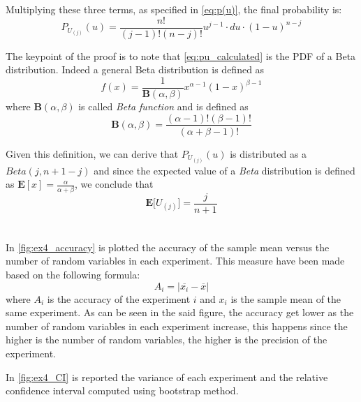 \documentclass[11pt,a4paper]{article}
\begin{document}
Multiplying these three terms, as specified in \autoref{eq:p(u)}, the final probability is:
\begin{equation}
  \label{eq:pu_calculated}
  P_{U_{(j)}}(u) = \frac{n!}{(j-1)!(n-j)!}u^{j-1}\cdot du \cdot (1-u)^{n-j}
\end{equation}

The keypoint of the proof is to note that \autoref{eq:pu_calculated} is the PDF of a Beta distribution.
Indeed a general Beta distribution is defined as
\begin{equation}
  \label{eq:beta}
  f(x) = \frac{1}{\mathbf{B}(\alpha,\beta)}x^{\alpha-1}(1-x)^{\beta-1}
\end{equation}
where $\mathbf{B}(\alpha,\beta)$ is called \textit{Beta function} and is defined as
\begin{equation}
  \label{eq:beta_func}
  \mathbf{B}(\alpha,\beta) = \frac{(\alpha-1)!(\beta-1)!}{(\alpha+\beta-1)!}
\end{equation}

Given this definition, we can derive that $P_{U_{(j)}}(u)$ is distributed as a $Beta(j,n+1-j)$ and since the expected value of a \textit{Beta} distribution is defined as $\mathbf{E}[x] = \frac{\alpha}{\alpha+\beta}$, we conclude that
\begin{equation}
  \label{eq:ex_value}
  \mathbf{E}\bigg[U_{(j)}\bigg] = \frac{j}{n+1}
\end{equation}

\section{}

In \autoref{fig:ex4_accuracy} is plotted the accuracy of the sample mean versus the number of random variables in each experiment. This measure have been made based on the following formula:
\begin{equation}
  A_i = |\overline{x_i} - \overline{x}|
\end{equation}
where $A_i$ is the accuracy of the experiment $i$ and $x_i$ is the sample mean of the same experiment. As can be seen in the said figure, the accuracy get lower as the number of random variables in each experiment increase, this happens since the higher is the number of random variables, the higher is the precision of the experiment.

In \autoref{fig:ex4_CI} is reported the variance of each experiment and the relative confidence interval computed using bootstrap method.
\end{document}
